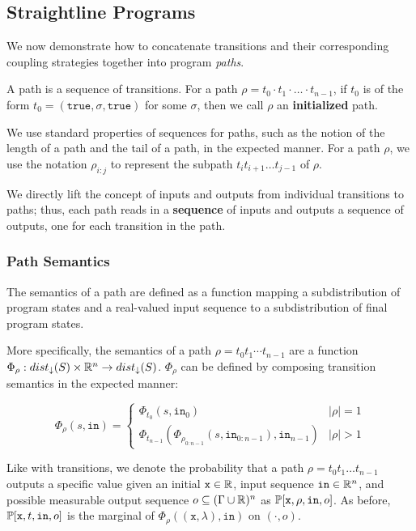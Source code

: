 
\subsection{Straightline Programs}

We now demonstrate how to concatenate transitions and their corresponding coupling strategies together into program \textit{paths}.

\begin{defn}[Paths]
    A path is a sequence of transitions. For a path $\rho = t_0\cdot t_1\cdot\ldots\cdot t_{n-1}$, if $t_0$ is of the form $t_0 = (\texttt{true}, \sigma, \texttt{true})$ for some $\sigma$, then we call $\rho$ an \textbf{initialized} path.
\end{defn}

We use standard properties of sequences for paths, such as the notion of the length of a path and the tail of a path, in the expected manner. For a path $\rho$, we use the notation $\rho_{i:j}$ to represent the subpath  $t_i t_{i+1} \ldots t_{j-1}$ of $\rho$.

We directly lift the concept of inputs and outputs from individual transitions to paths; thus, each path reads in a \textbf{sequence} of inputs and outputs a sequence of outputs, one for each transition in the path. 

\subsubsection{Path Semantics}

The semantics of a path are defined as a function mapping a subdistribution of program states and a real-valued input sequence to a subdistribution of final program states. 

More specifically, the semantics of a path $\rho = t_0t_1\cdots t_{n-1}$ are a function $\Phi_\rho: dist_\downarrow(S)\times \mathbb{R}^n \to dist_\downarrow(S)$. $\Phi_\rho$ can be defined by composing transition semantics in the expected manner:

\[\Phi_\rho(s, \texttt{in}) = \begin{cases}
    \Phi_{t_0}(s, \texttt{in}_0)& |\rho| = 1\\
    \Phi_{t_{n-1}}(\Phi_{\rho_{0:n-1}}(s, \texttt{in}_{0:n-1}), \texttt{in}_{n-1})& |\rho| >1
\end{cases}\]


Like with transitions, we denote the probability that a path $\rho = t_0 t_1\ldots t_{n-1}$ outputs a specific value given an initial $\texttt{x}\in\mathbb{R}$, input sequence $\texttt{in} \in \mathbb{R}^n$, and possible measurable output sequence $o \subseteq (\Gamma\cup\mathbb{R})^n$ as $\mathbb{P}[\texttt{x}, \rho, \texttt{in}, o]$. As before, $\mathbb{P}[\texttt{x}, t, \texttt{in}, o]$ is the marginal of $\Phi_\rho((\texttt{x}, \lambda), \texttt{in})$ on $(\cdot, o)$.

